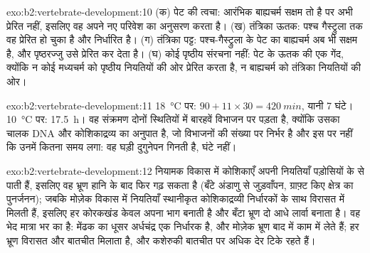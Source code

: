 \begin{solution}{exo:b2:vertebrate-development:10}
(क) पेट की त्वचा: आरंभिक बाह्यचर्म सक्षम तो है पर अभी प्रेरित नहीं,
इसलिए वह अपने नए परिवेश का अनुसरण करता है। (ख) तंत्रिका ऊतक: पश्च
गैस्ट्रुला तक वह प्रेरित हो चुका है और निर्धारित है। (ग) तंत्रिका पट्ट:
पश्च-गैस्ट्रुला के पेट का बाह्यचर्म अब भी सक्षम है, और पृष्ठरज्जु उसे
प्रेरित कर देता है। (घ) कोई पृष्ठीय संरचना नहीं: पेट के ऊतक की एक गेंद,
क्योंकि न कोई मध्यचर्म को पृष्ठीय नियतियों की ओर प्रेरित करता है, न
बाह्यचर्म को तंत्रिका नियतियों की ओर।
\end{solution}

\begin{solution}{exo:b2:vertebrate-development:11}
\qty{18}{\celsius} पर: $90 + 11\times 30 = \qty{420}{min}$, यानी 7 घंटे।
\qty{10}{\celsius} पर: \qty{17.5}{h}। वह संक्रमण दोनों स्थितियों में
बारहवें विभाजन पर पड़ता है, क्योंकि उसका चालक DNA और कोशिकाद्रव्य का
अनुपात है, जो विभाजनों की संख्या पर निर्भर है और इस पर नहीं कि उनमें
कितना समय लगा: वह घड़ी दुगुनेपन गिनती है, घंटे नहीं।
\end{solution}

\begin{solution}{exo:b2:vertebrate-development:12}
नियामक विकास में कोशिकाएँ अपनी नियतियाँ पड़ोसियों के  से पाती
हैं, इसलिए वह भ्रूण हानि के बाद फिर गढ़ सकता है (बँटे अंडाणु से
जुड़वाँपन, ग्राफ़्ट किए क्षेत्र का पुनर्जनन); जबकि मोज़ेक
विकास में नियतियाँ स्थानीकृत कोशिकाद्रव्यी निर्धारकों के साथ विरासत में
मिलती हैं, इसलिए हर कोरकखंड केवल अपना भाग बनाती है और बँटा
भ्रूण दो आधे लार्वा बनाता है। वह भेद मात्रा भर का है: मेंढक का
धूसर अर्धचंद्र एक निर्धारक है, और मोज़ेक भ्रूण बाद में  काम में
लेते हैं; हर भ्रूण विरासत और बातचीत मिलाता है, और कशेरुकी बातचीत पर
अधिक देर टिके रहते हैं।
\end{solution}

